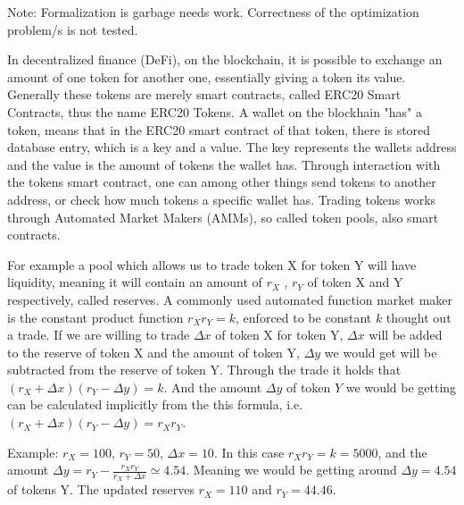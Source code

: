 




\maketitle

Note:\newline
Formalization is garbage needs work.\newline
Correctness of the optimization problem/s is not tested.\newline


In decentralized finance (DeFi), on the blockchain, it is possible to exchange
an amount of one token for another one, essentially giving a token its value.
Generally these tokens are merely smart contracts, called ERC20 Smart
Contracts, thus the name ERC20 Tokens. A wallet on the blockhain "has" a
token, means that in the ERC20 smart contract of that token, there is stored
database entry, which is a key and a value. The key represents the wallets
address and the value is the amount of tokens the wallet has. Through
interaction with the tokens smart contract, one can among other things send
tokens to another address, or check how much tokens a specific wallet has.
Trading tokens works through Automated Market Makers (AMMs), so called token
pools, also smart contracts.
\newline

For example a pool which allows us to trade token X for token Y will have
liquidity, meaning it will contain an amount of $r_X$ , $r_Y$ of token X and
Y respectively, called reserves. A commonly used automated function market
maker is the constant product function $r_Xr_Y = k$, enforced to be constant
$k$ thought out a trade. If we are willing to trade $\Delta x$ of token X for
token Y, $\Delta x$ will be added to the reserve of token X and the amount of
token Y, $\Delta y$ we would get will be subtracted from the reserve of token
Y. Through the trade it holds that $(r_X + \Delta x)(r_Y - \Delta y) = k$.
And the amount $\Delta y$ of token $Y$ we would be getting can be calculated
implicitly from the this formula, i.e. $(r_X + \Delta x)(r_Y - \Delta y) =
r_Xr_Y$.
\newline

Example: $r_X = 100$, $r_Y = 50$, $\Delta x = 10$. In this case $r_Xr_Y = k =
5000$, and the amount $\Delta y = r_Y - \frac{r_Xr_Y}{r_X + \Delta x} \simeq
4.54$. Meaning we would be getting around $\Delta y = 4.54$ of tokens Y. The
updated reserves $r_X = 110$ and $r_Y = 44.46$.
\newline

